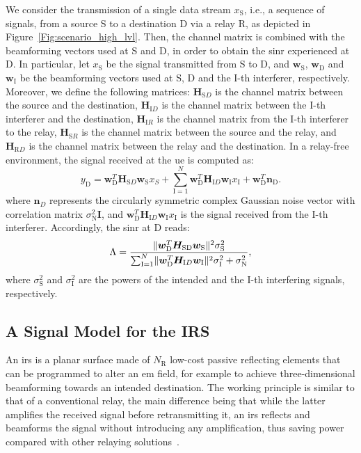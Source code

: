 We consider the transmission of a single data stream $x_{\mathrm S}$, i.e., a sequence of signals, from a source S to a destination D via a relay R, as depicted in Figure~\ref{Fig:scenario_high_lvl}. 
Then, the channel matrix is combined with the beamforming vectors used at S and D, in order to obtain the \gls{sinr} experienced at D. 
In particular, let $x_{\mathrm S}$ be the signal transmitted from S to D, and $\bm{w}_{\mathrm S}$, $\bm{w}_{\mathrm D}$ and $\bm{w}_{\mathrm I}$ be the beamforming vectors used at S, D and the I-th interferer, respectively. Moreover, we define the following matrices:
$\bm{H}_{\mathrm SD}$ is the channel matrix between the source and the destination,
 $\bm{H}_{\mathrm ID}$ is the channel matrix between the \mbox{I-th} interferer and the destination,
 $\bm{H}_{\mathrm IR}$ is the channel matrix from the \mbox{I-th} interferer to the relay,
 $\bm{H}_{\mathrm SR}$ is the channel matrix between the source and the relay,
 and $\bm{H}_{\mathrm RD}$ is the channel matrix between the relay and the destination.
In a relay-free environment, the signal received at the \gls{ue} is computed as:
\begin{equation}
    \label{eq:input_output_nodev}
    y_{\mathrm D} = \bm{w}_{\mathrm D}^{T} \bm{H}_{\mathrm SD} \bm{w}_{\mathrm S} x_{S} + \sum_{\mathrm{I}=1}^{N} \bm{w}_{\mathrm D}^{T} \bm{H}_{\mathrm ID}  \bm{w}_{\mathrm I} x_{\mathrm I} + \bm{w}_{\mathrm D}^{T} \bm{n}_{\mathrm D}.
\end{equation}
where $\bm{n}_D$ represents the circularly symmetric complex Gaussian noise vector with correlation matrix $\sigma_{\mathrm N}^2 \bm{I} $, and $\bm{w}_{\mathrm D}^{T} \bm{H}_{\mathrm ID} \bm{w}_{\mathrm I} x_{\mathrm I}$ is the signal received from the $\mathrm I$-th interferer.
Accordingly, the \gls{sinr} at D reads:
\begin{equation}
	\Lambda = \frac{ \lVert \bm{w}_{ \textrm D}^{T} \bm{H}_{\textrm {SD}}\bm{w}_{ \textrm S} \rVert^2 \sigma_{\mathrm S}^2 } { \sum_{\mathrm{I}=1}^{N} \lVert \bm{w}_{\mathrm D}^{T} \bm{H}_{\mathrm ID} \bm{w}_{\mathrm I} \rVert^2 \sigma_{\mathrm I}^2 + \sigma_{\mathrm N}^2 },
\end{equation}
where $\sigma_{\mathrm S}^2$ and $\sigma_{\mathrm I}^2$ are the powers of the intended and the $\mathrm{I}$-th interfering signals, respectively.
\subsection{A Signal Model for the IRS}
\label{sec:irs_phy_model} 
An \gls{irs} is a planar surface made of $N_{\mathrm R}$ low-cost passive reflecting elements that can be programmed to alter an \gls{em} field, for example to achieve three-dimensional beamforming towards an intended destination.
The working principle is similar to that of a conventional relay, the main difference being that while the latter amplifies the received signal before retransmitting it, an \gls{irs} reflects and beamforms the signal without introducing any amplification, thus saving power compared with other relaying solutions~\cite{bjornson2019intelligent}. %


